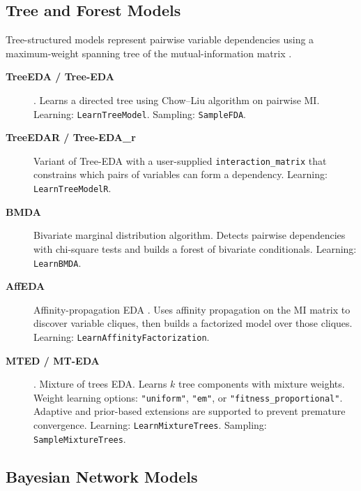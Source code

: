 \documentclass[a4paper,11pt]{article}
\begin{document}
\subsection{Tree and Forest Models}
\label{sec:trees}

Tree-structured models represent pairwise variable dependencies using a
maximum-weight spanning tree of the mutual-information matrix \citep{Chow_and_Liu:1968}.

\begin{description}
  \item[\textbf{TreeEDA / Tree-EDA}] \citep{Baluja_and_Davies:1997,Pelikan_and_Muhlenbein:1999}.
    Learns a directed tree using Chow--Liu algorithm on pairwise MI.
    Learning: \texttt{LearnTreeModel}. Sampling: \texttt{SampleFDA}.

  \item[\textbf{TreeEDAR / Tree-EDA\_r}]
    Variant of Tree-EDA with a user-supplied \texttt{interaction\_matrix} that
    constrains which pairs of variables can form a dependency.
    Learning: \texttt{LearnTreeModelR}.

  \item[\textbf{BMDA}]
    Bivariate marginal distribution algorithm.  Detects pairwise dependencies
    with chi-square tests and builds a forest of bivariate conditionals.
    Learning: \texttt{LearnBMDA}.

  \item[\textbf{AffEDA}]
    Affinity-propagation EDA \citep{Frey_and_Dueck:2007,Santana_et_al:2008}.
    Uses affinity propagation on the MI matrix to discover variable cliques,
    then builds a factorized model over those cliques.
    Learning: \texttt{LearnAffinityFactorization}.

  \item[\textbf{MTED / MT-EDA}] \citep{Santana_et_al:2001br}.
    Mixture of trees EDA.  Learns $k$ tree components with mixture weights.
    Weight learning options: \texttt{"uniform"}, \texttt{"em"}, or
    \texttt{"fitness\_proportional"}.  Adaptive and prior-based extensions
    are supported to prevent premature convergence.
    Learning: \texttt{LearnMixtureTrees}. Sampling: \texttt{SampleMixtureTrees}.
\end{description}

\subsection{Bayesian Network Models}
\label{sec:bayes}
\end{document}
